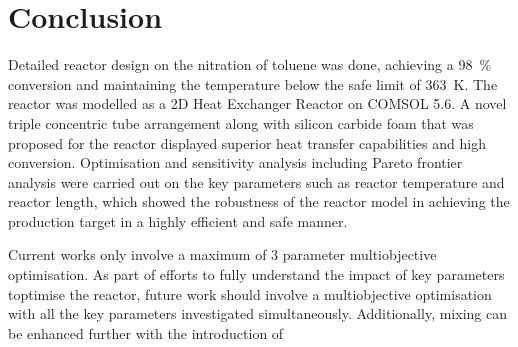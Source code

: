 \section{Conclusion} \label{sec:conclusion}
Detailed reactor design on the nitration of toluene was done, achieving a \SI{98}{\%} conversion and maintaining the temperature below the safe limit of \SI{363}{\K}. The reactor was modelled as a 2D Heat Exchanger Reactor on COMSOL 5.6. A novel triple concentric tube arrangement along with silicon carbide foam that was proposed for the reactor displayed superior heat transfer capabilities and high conversion. Optimisation and sensitivity analysis including Pareto frontier analysis were carried out on the key parameters such as reactor temperature and reactor length, which showed the robustness of the reactor model in achieving the production target in a highly efficient and safe manner. 

Current works only involve a maximum of 3 parameter multiobjective optimisation. As part of efforts to fully understand the impact of key parameters toptimise the reactor, future work should involve a multiobjective optimisation with all the key parameters investigated simultaneously. Additionally, mixing can be enhanced further with the introduction of 


